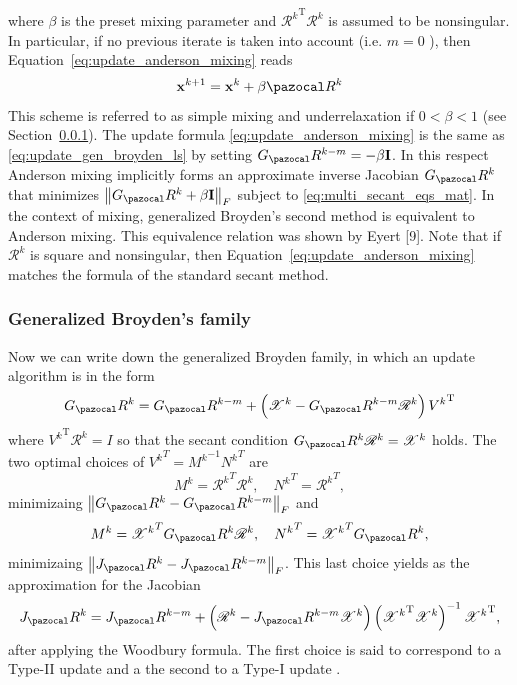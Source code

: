 where \(\beta\) is the preset mixing parameter and \({\mathscr{R}^{k}}^{\mathrm{T}} \mathscr{R}^{k}\) is assumed to be nonsingular.
In particular, if no previous iterate is taken into account (i.e. \(m=0\) ), then Equation~\eqref{eq:update_anderson_mixing} reads
\begin{equation}
  \mathbf x^{k+1}=\mathbf x^{k}+\beta \pazocal R^{k}
\end{equation}
This scheme is referred to as simple mixing and underrelaxation if \(0<\beta<1\) (see Section~\ref{}).
The update formula \eqref{eq:update_anderson_mixing} is the same as \eqref{eq:update_gen_broyden_ls} by setting \(G_\pazocal R^{k-m}=-\beta \mathbf I\).
In this respect Anderson mixing implicitly forms an approximate inverse Jacobian \(G_\pazocal R^{k}\) that minimizes \(\left\|G_\pazocal R^{k}+\beta \mathbf I\right\|_{F}\) subject to \eqref{eq:multi_secant_eqs_mat}.
In the context of mixing, generalized Broyden's second method is equivalent to Anderson mixing. This equivalence relation was shown by Eyert [9].
Note that if \(\mathscr{R}^{k}\) is square and nonsingular, then Equation~\eqref{eq:update_anderson_mixing} matches the formula of the standard secant method.

\subsubsection{Generalized Broyden's family}

Now we can write down the generalized Broyden family, in which an update algorithm is in the form
\begin{equation} \label{eq:inv_jacob_gen_broyden}
G_\pazocal R^{k}=G_\pazocal R^{k-m}+\left(\mathscr{X}^{k}-G_\pazocal R^{k-m} \mathscr{R}^{k}\right) {V^{k}}^{\mathrm{T}}
\end{equation}
where \({V^{k}}^{\mathrm{T}} \mathscr{R}^{k}=I\) so that the secant condition \(G_\pazocal R^{k} \mathscr{R}^{k}=\mathscr{X}^{k}\) holds.
The two optimal choices of \({V^k}^T = {M^k}^{-1}{N^k}^T\) are
\begin{equation} \label{eq:broyden_type_ii}
  {M^k} = {\mathscr R^k}^T \mathscr R^k,\quad {N^k}^T = {\mathscr R^k}^T,
\end{equation}
minimizaing \(\left\|G_\pazocal R^k - G_\pazocal R^{k-m}\right\|_F\) and
\begin{equation} \label{eq:broyden_type_i}
  {M^k} = {\mathscr X^k}^T G_\pazocal R^k \mathscr R^k,\quad {N^k}^T = {\mathscr X^k}^T G_\pazocal R^k,
\end{equation}
minimizaing \(\left\|J_\pazocal R^k - J_\pazocal R^{k-m}\right\|_F\).
This last choice yields as the approximation for the Jacobian
\begin{equation}
  J_\pazocal R^{k}=J_\pazocal R^{k-m}+\left(\mathscr{R}^{k}-J_\pazocal R^{k-m} \mathscr{X}^{k}\right)\left({\mathscr{X}^{k}}^{\mathrm{T}} \mathscr{X}^{k}\right)^{-1} {\mathscr{X}^{k}}^{\mathrm{T}},
\end{equation}
after applying the Woodbury formula.
The first choice is said to correspond to a Type-II update and a the second to a Type-I update \citep{fang_two_2009}.

